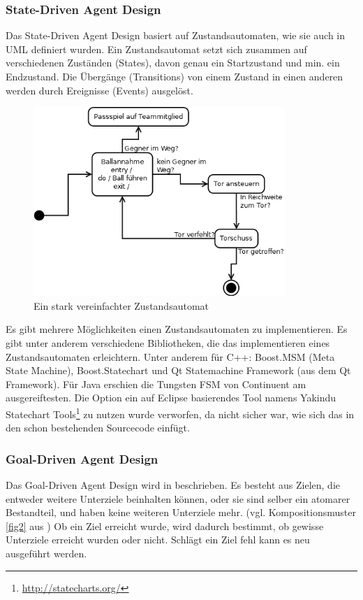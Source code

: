 \documentclass[fontsize=12pt,a4paper,final]{scrartcl}[2003/01/01]
\begin{document}
\subsubsection{State-Driven Agent Design}
Das State-Driven Agent Design basiert auf Zustandsautomaten, wie sie auch in UML definiert wurden. Ein Zustandsautomat setzt sich zusammen auf verschiedenen Zuständen (States), davon genau ein Startzustand und min. ein Endzustand. Die Übergänge (Transitions) von einem Zustand in einen anderen werden durch Ereignisse (Events) ausgelöst.

\begin{figure}[ht]
	\centering
  \includegraphics[width=0.85\textwidth]{Grafiken/KI/Bsp-Zustandsdiagramm.png}
	\caption{Ein stark vereinfachter Zustandsautomat}
	\label{fig1}
\end{figure}

Es gibt mehrere Möglichkeiten einen Zustandsautomaten zu implementieren. Es gibt unter anderem verschiedene Bibliotheken, die das implementieren eines Zustandsautomaten erleichtern. Unter anderem für C++: Boost.MSM (Meta State Machine), Boost.Statechart und Qt Statemachine Framework (aus dem Qt Framework). Für Java erschien die Tungsten FSM von Continuent am ausgereiftesten. Die Option ein auf Eclipse basierendes Tool namens Yakindu Statechart Tools\footnote{\url{http://statecharts.org/}} zu nutzen wurde verworfen, da nicht sicher war, wie sich das in den schon bestehenden Sourcecode einfügt.

\subsubsection{Goal-Driven Agent Design}
Das Goal-Driven Agent Design wird in \cite[S. 379 ff.]{buckland2005programming} beschrieben. Es besteht aus Zielen, die entweder weitere Unterziele beinhalten können, oder sie sind selber ein atomarer Bestandteil, und haben keine weiteren Unterziele mehr. (vgl. Kompositionsmuster \ref{fig2} aus \cite{gamma1994design}) Ob ein Ziel erreicht wurde, wird dadurch bestimmt, ob gewisse Unterziele erreicht wurden oder nicht. Schlägt ein Ziel fehl kann es neu ausgeführt werden.
\end{document}

